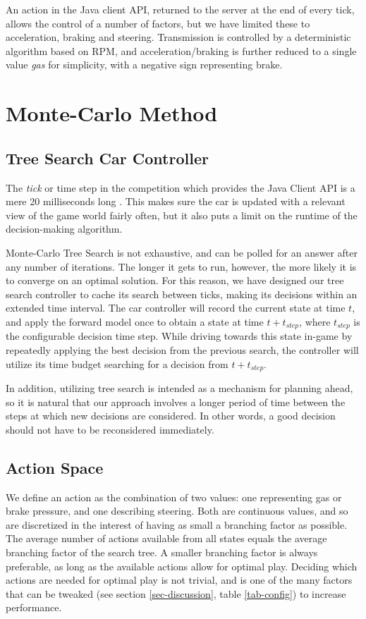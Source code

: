 \documentclass[conference]{IEEEtran}
\begin{document}
An action in the Java client API, returned to the server at the end of every tick, allows the control of a number of factors, but we have limited these to acceleration, braking and steering. Transmission is controlled by a deterministic algorithm based on RPM, and acceleration/braking is further reduced to a single value \emph{gas} for simplicity, with a negative sign representing brake.

\section{Monte-Carlo Method}
\label{sec-method}
\subsection{Tree Search Car Controller}
The \emph{tick} or time step in the competition which provides the Java Client API is a mere 20 milliseconds long \cite{manual}. This makes sure the car is updated with a relevant view of the game world fairly often, but it also puts a limit on the runtime of the decision-making algorithm.

Monte-Carlo Tree Search is not exhaustive, and can be polled for an answer after any number of iterations. The longer it gets to run, however, the more likely it is to converge on an optimal solution. For this reason, we have designed our tree search controller to cache its search between ticks, making its decisions within an extended time interval. The car controller will record the current state at time $t$, and apply the forward model once to obtain a state at time $t+t_{step}$, where $t_{step}$ is the configurable decision time step. While driving towards this state in-game by repeatedly applying the best decision from the previous search, the controller will utilize its time budget searching for a decision from $t+t_{step}$.

In addition, utilizing tree search is intended as a mechanism for planning ahead, so it is natural that our approach involves a longer period of time between the steps at which new decisions are considered. In other words, a good decision should not have to be reconsidered immediately.

\subsection{Action Space}
We define an action as the combination of two values: one representing gas or brake pressure, and one describing steering. Both are continuous values, and so are discretized in the interest of having as small a branching factor as possible. The average number of actions available from all states equals the average branching factor of the search tree. A smaller branching factor is always preferable, as long as the available actions allow for optimal play. Deciding which actions are needed for optimal play is not trivial, and is one of the many factors that can be tweaked (see section \ref{sec-discussion}, table \ref{tab-config}) to increase performance.
\end{document}
